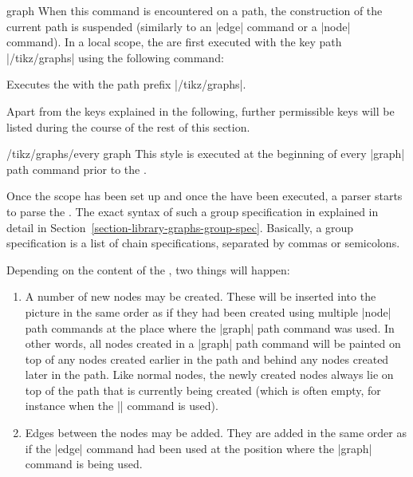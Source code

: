 \begin{pathoperation}{graph}{}
  When this command is encountered on a path, the construction of the
  current path is suspended (similarly to an |edge| command or a
  |node| command). In a local scope, the  are first
  executed with the key path |/tikz/graphs| using the following
  command:
  \begin{command}{\tikzgraphsset{}}
    Executes the  with the path prefix |/tikz/graphs|.    
  \end{command}
  Apart from the keys explained in the following, further permissible
  keys will be listed during the course of the rest of this section.

  \begin{stylekey}{/tikz/graphs/every graph}
    This style is executed at the beginning of every |graph| path
    command prior to the .
  \end{stylekey}

  Once the scope has been set up and once the  have been
  executed, a parser starts to parse the . The exact syntax of such a group specification
  in explained in detail in
  Section~\ref{section-library-graphs-group-spec}. Basically, a group
  specification is a list of chain specifications, separated by commas
  or semicolons.

  Depending on the content of the , two
  things will happen:
  \begin{enumerate}
  \item A number of new nodes may be created. These will be inserted
    into the picture in the same order as if they had been created
    using multiple |node| path commands at the place where the |graph|
    path command was used. In other words, all nodes created in a
    |graph| path command will be painted on top of any nodes created
    earlier in the path and behind any nodes created later in the
    path. Like normal nodes, the newly created nodes always lie on top
    of the path that is currently being created (which is often
    empty, for instance when the |\graph| command is used).
  \item Edges between the nodes may be added. They are added in the
    same order as if the |edge| command had been used at the position
    where the |graph| command is being used.
  \end{enumerate}


\end{pathoperation}
